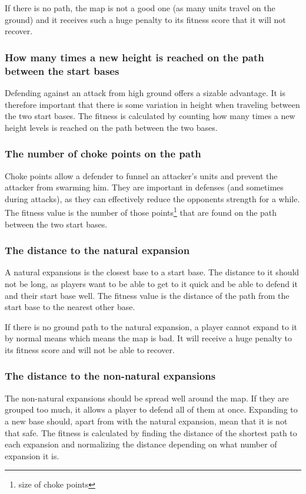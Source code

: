 If there is no path, the map is not a good one (as many units travel on the ground) and it receives such a huge penalty to its fitness score that it will not recover.

\subsubsection*{How many times a new height is reached on the path between the start bases}
Defending against an attack from high ground offers a sizable advantage. It is therefore important that there is some variation in height when traveling between the two start bases. The fitness is calculated by counting how many times a new height levels is reached on the path between the two bases.

\subsubsection*{The number of choke points on the path}
Choke points allow a defender to funnel an attacker's units and prevent the attacker from swarming him. They are important in defenses (and sometimes during attacks), as they can effectively reduce the opponents strength for a while. The fitness value is the number of those points\footnote{size of choke points} that are found on the path between the two start bases.

\subsubsection*{The distance to the natural expansion}
A natural expansions is the closest base to a start base. The distance to it should not be long, as players want to be able to get to it quick and be able to defend it and their start base well. The fitness value is the distance of the path from the start base to the nearest other base.

If there is no ground path to the natural expansion, a player cannot expand to it by normal means which means the map is bad. It will receive a huge penalty to its fitness score and will not be able to recover.

\subsubsection*{The distance to the non-natural expansions}
The non-natural expansions should be spread well around the map. If they are grouped too much, it allows a player to defend all of them at once. Expanding to a new base should, apart from with the natural expansion, mean that it is not that safe. The fitness is calculated by finding the distance of the shortest path to each expansion and normalizing the distance depending on what number of expansion it is.

